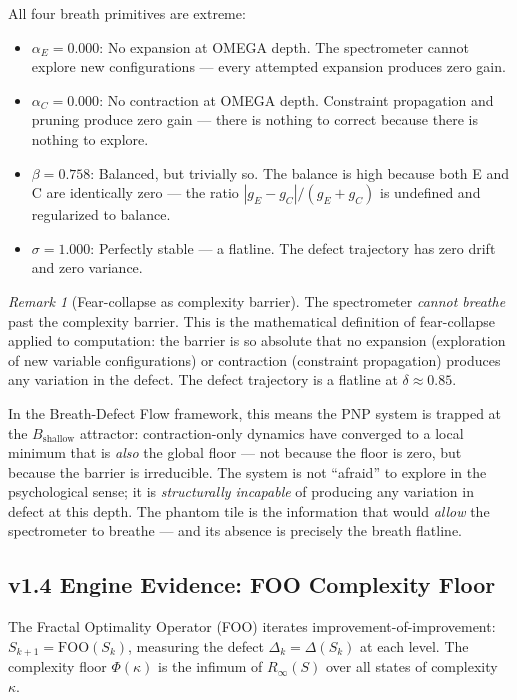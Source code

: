\documentclass[11pt]{article}
\theoremstyle{definition}
\theoremstyle{remark}
\newtheorem{remark}[theorem]{Remark}
\begin{document}
\noindent
All four breath primitives are extreme:
\begin{itemize}[nosep]
  \item $\alpha_E = 0.000$: No expansion at OMEGA depth.  The spectrometer
    cannot explore new configurations --- every attempted expansion produces
    zero gain.
  \item $\alpha_C = 0.000$: No contraction at OMEGA depth.  Constraint
    propagation and pruning produce zero gain --- there is nothing to correct
    because there is nothing to explore.
  \item $\beta = 0.758$: Balanced, but trivially so.  The balance is high
    because both E and C are identically zero --- the ratio $|g_E - g_C|/(g_E + g_C)$
    is undefined and regularized to balance.
  \item $\sigma = 1.000$: Perfectly stable --- a flatline.  The defect
    trajectory has zero drift and zero variance.
\end{itemize}

\begin{remark}[Fear-collapse as complexity barrier]
\label{rem:fear-collapse-pnp}
The spectrometer \emph{cannot breathe} past the complexity barrier.  This is
the mathematical definition of fear-collapse applied to computation: the
barrier is so absolute that no expansion (exploration of new variable
configurations) or contraction (constraint propagation) produces any variation
in the defect.  The defect trajectory is a flatline at $\delta \approx 0.85$.

In the Breath-Defect Flow framework, this means the PNP system is trapped at
the $B_{\mathrm{shallow}}$ attractor: contraction-only dynamics have converged
to a local minimum that is \emph{also} the global floor --- not because the
floor is zero, but because the barrier is irreducible.  The system is not
``afraid'' to explore in the psychological sense; it is \emph{structurally
incapable} of producing any variation in defect at this depth.  The phantom
tile is the information that would \emph{allow} the spectrometer to breathe ---
and its absence is precisely the breath flatline.
\end{remark}

\subsection{v1.4 Engine Evidence: FOO Complexity Floor}
\label{sec:foo-pnp}

The Fractal Optimality Operator (FOO) iterates improvement-of-improvement:
$S_{k+1} = \mathrm{FOO}(S_k)$, measuring the defect $\Delta_k = \Delta(S_k)$
at each level.  The complexity floor $\Phi(\kappa)$ is the infimum of
$R_\infty(S)$ over all states of complexity~$\kappa$.
\end{document}
